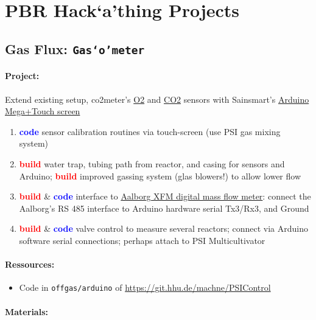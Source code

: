 \documentclass[12pt,a4paper]{scrartcl}
\newcommand{\build}[0]{\textcolor{red}{\textbf{build}}}
\newcommand{\code}[0]{\textcolor{blue}{\textbf{code}}}
\newcommand{\hack}[0]{Hack`a'thing}
\newcommand{\gasometer}[0]{\texttt{Gas`o'meter}}
\begin{document}
\section{PBR \hack{} Projects}
\label{proj}


\subsection{Gas Flux: \gasometer{}}
\label{gas}
\paragraph{Project:} 
Extend existing setup, co2meter's
\href{http://www.co2meter.com/collections/co2-sensors/oxygen-sensors}{O2}
and
\href{http://www.co2meter.com/collections/co2-sensors/products/cozir-5-100-co2-sensor}{CO2}
sensors with Sainsmart's
\href{http://www.sainsmart.com/featured-products/sainsmart-mega2560-board-3-5-tft-lcd-module-display-shield-kit-for-atmel-atmega-avr-16au-atmega8u2.html}{Arduino
  Mega+Touch screen}

\begin{enumerate}
\item \code{} sensor calibration routines via touch-screen (use PSI
  gas mixing system)
\item \build{} water trap, tubing path from reactor, and casing for
  sensors and Arduino; \build{} improved gassing system (glas
  blowers!) to allow lower flow
\item \build{} \& \code{} interface to \href{http://www.aalborg.com/index.php/main_page/product_overview/id_product_overview/63}{Aalborg XFM digital mass flow
  meter}: connect the Aalborg's RS 485 interface to Arduino hardware
  serial Tx3/Rx3, and Ground
\item \build{} \& \code{} valve control to measure several reactors;
  connect via Arduino software serial connections; perhaps attach to
  PSI Multicultivator
\end{enumerate}

\paragraph{Ressources:}
\begin{itemize}
\item Code in  \texttt{offgas/arduino} of
  \url{https://git.hhu.de/machne/PSIControl} 
\end{itemize}

\paragraph{Materials:}
\end{document}
